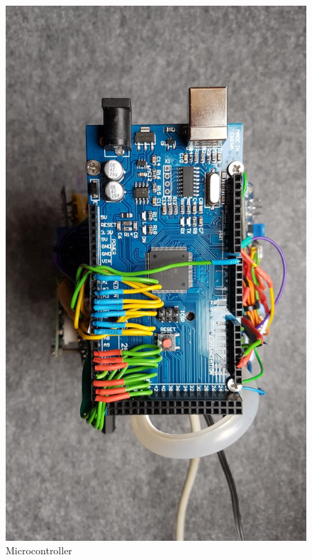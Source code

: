 \documentclass[10pt]{article}
\begin{document}
\begin{figure}[H]
\centering
\includegraphics[scale=0.15, angle=90]{Bilder/Arduino_Mega.jpeg}
\caption{Microcontroller}
\label{Arduino_Mega}
\end{figure} 
\end{document}
